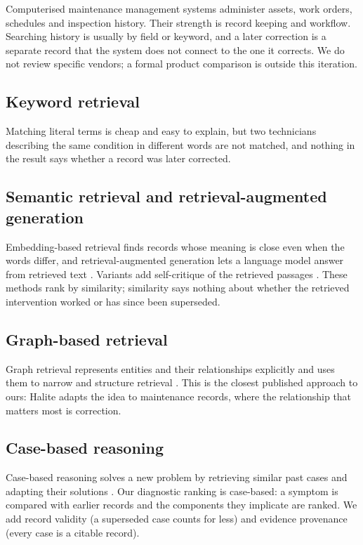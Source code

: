 Computerised maintenance management systems administer assets, work orders, schedules and inspection history. Their strength is record keeping and workflow. Searching history is usually by field or keyword, and a later correction is a separate record that the system does not connect to the one it corrects. We do not review specific vendors; a formal product comparison is outside this iteration.

\subsection{Keyword retrieval}

Matching literal terms is cheap and easy to explain, but two technicians describing the same condition in different words are not matched, and nothing in the result says whether a record was later corrected.

\subsection{Semantic retrieval and retrieval-augmented generation}

Embedding-based retrieval finds records whose meaning is close even when the words differ, and retrieval-augmented generation lets a language model answer from retrieved text \citep{lewis2020}. Variants add self-critique of the retrieved passages \citep{asai2023}. These methods rank by similarity; similarity says nothing about whether the retrieved intervention worked or has since been superseded.

\subsection{Graph-based retrieval}

Graph retrieval represents entities and their relationships explicitly and uses them to narrow and structure retrieval \citep{edge2024}. This is the closest published approach to ours: Halite adapts the idea to maintenance records, where the relationship that matters most is correction.

\subsection{Case-based reasoning}

Case-based reasoning solves a new problem by retrieving similar past cases and adapting their solutions \citep{aamodt1994}. Our diagnostic ranking is case-based: a symptom is compared with earlier records and the components they implicate are ranked. We add record validity (a superseded case counts for less) and evidence provenance (every case is a citable record).

